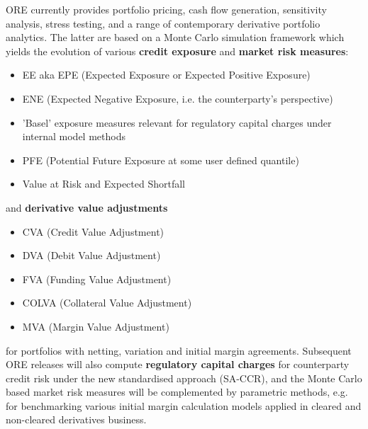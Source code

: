 \documentclass[12pt, a4paper]{article}
\begin{document}
ORE currently provides portfolio pricing, cash flow generation, sensitivity analysis, stress testing, and a range of 
contemporary derivative portfolio analytics. The latter are based on a Monte Carlo simulation framework which yields 
the evolution of various {\bf credit exposure} and {\bf market risk measures}:
\begin{itemize}
\item EE aka EPE (Expected Exposure or Expected Positive Exposure)
\item ENE (Expected Negative Exposure, i.e. the counterparty's perspective)
\item 'Basel' exposure measures relevant for regulatory capital charges under internal model methods 
\item PFE (Potential Future Exposure at some user defined quantile)
\item Value at Risk and Expected Shortfall
\end{itemize}
and {\bf derivative value adjustments}
\begin{itemize}
\item CVA (Credit Value Adjustment)
\item DVA (Debit Value Adjustment)
\item FVA (Funding Value Adjustment)
\item COLVA (Collateral Value Adjustment)
\item MVA (Margin Value Adjustment)
\end{itemize}
for portfolios with netting, variation and initial margin agreements.  Subsequent ORE releases will also compute {\bf
  regulatory capital charges} for counterparty credit risk under the new standardised approach (SA-CCR), and the Monte
Carlo based market risk measures will be complemented by parametric methods, e.g. for benchmarking various initial
margin calculation models applied in cleared and non-cleared derivatives business.
\end{document}
